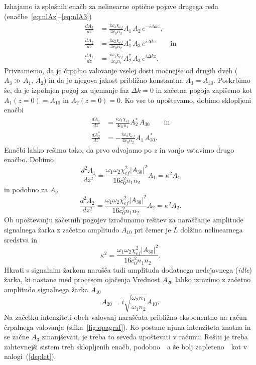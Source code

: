 Izhajamo iz splošnih enačb za nelinearne optične pojave drugega reda 
(enačbe~\ref{eq:nlAz}--\ref{eq:nlA3})
\begin{align}
\frac{dA_{3}}{dz} &=\frac{i\omega_{3}\chi_{ef}}{4c_0 n_3} A_{1}\, A_{2}\, e^{-i\Delta kz}, \\
\frac{dA_{2}}{dz} &=\frac{i\omega_{2}\chi_{ef}}{4c_0 n_2} A_{1}^*\, A_{3}\, e^{i\Delta kz}\qquad \textrm{in}\\
\frac{dA_{1}}{dz} &=\frac{i\omega_{1}\chi_{ef}}{4c_0 n_1} A_{2}^*\, A_{3}\, e^{i\Delta kz}.
\label{eq:opaA}
\end{align}
Privzamemo, da je črpalno valovanje vselej dosti močnejše od drugih dveh
($A_{3}\gg A_{1}$, $A_{2}$) in da je njegova jakost približno konstantna $A_3 = A_{30}$.
Poskrbimo še, da je izpolnjen pogoj za ujemanje faz $\Delta k=0$ in
začetna pogoja zapišemo kot $A_{1}(z=0)=A_{10}$ in $A_{2}(z=0)=0$. Ko vse to upoštevamo,
dobimo sklopljeni enačbi
\begin{align}
\frac{dA_{1}}{dz} &= \frac{i\omega_{1}\chi_{ef}}{4c_0 n_1} A_{2}^*\, A_{30}\label{eq:opaA1} 
\qquad \mathrm{in} \\
\frac{dA_{2}^*}{dz} &= -\frac{i\omega_{2}\chi_{ef}}{4c_0 n_2} A_{1}\, A_{30}^*.
\label{eq:opaA2}
\end{align}
Enačbi lahko rešimo tako, da prvo odvajamo po $z$ in vanjo vstavimo drugo enačbo.
Dobimo
\begin{equation}
\frac{d^2 A_1}{d z^2} = \frac{\omega_1 \omega_2 \chi_{ef}^2|A_{30}|^2}
{16 c_0^2 n_1 n_2} A_1 = \kappa^2 A_1
\end{equation}
in podobno za $A_2$
\begin{equation}
\frac{d^2 A_2}{d z^2} = \frac{\omega_1 \omega_2 \chi_{ef}^2|A_{30}|^2}
{16 c_0^2 n_1 n_2} A_2 = \kappa^2 A_2.
\end{equation}
Ob upoštevanju začetnih pogojev izračunamo rešitev za naraščanje amplitude signalnega žarka
z začetno amplitudo $A_{10}$
pri čemer je $L$ dolžina nelinearnega sredstva in 
\begin{equation}
\kappa^2 = \frac{\omega_1 \omega_2 \chi_{ef}^2|A_{30}|^2}
{16 c_0^2 n_1 n_2}.
\label{opakapa}
\end{equation}
Hkrati s signalnim žarkom narašča tudi amplituda dodatnega nedejavnega 
({\it idle}) žarka, ki nastane med procesom ojačenja
Vrednost $A_{20}$ lahko izrazimo z začetno amplitudo signalnega žarka $A_{10}$
\begin{equation}
A_{20} = i \sqrt{\frac{\omega_2 n_1}{\omega_1 n_2}} A_{10}.
\label{opakapaA}
\end{equation}
Na začetku intenziteti obeh valovanj naraščata približno eksponentno na račun črpalnega
valovanja (slika~\ref{fig:opagraf}). Ko postane njuna intenziteta znatna in se 
začne $A_3$ zmanjševati, je treba to seveda
upoštevati v računu. Rešiti je treba zahtevnejši sistem treh 
sklopljenih enačb, podobno~\textendash~a še bolj zapleteno~\textendash~kot v nalogi~(\ref{deplet}).

